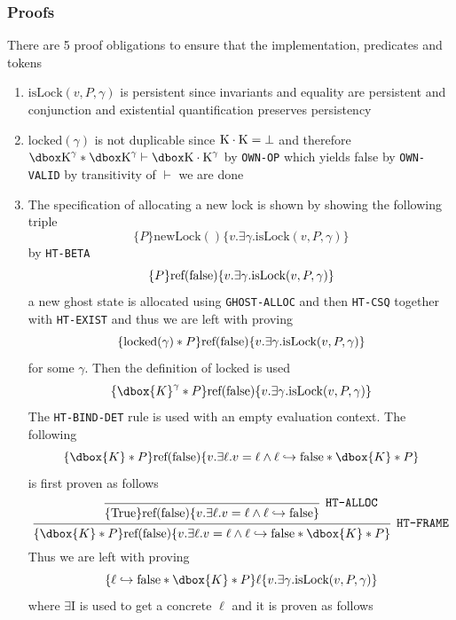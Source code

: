\subsubsection{Proofs}
There are 5 proof obligations to ensure that the implementation, predicates and tokens 
\begin{enumerate}
	\item $\text{isLock}(v,P,\gamma)$ is persistent since invariants and equality are persistent and conjunction and existential quantification preserves persistency
  \item $\text{locked}(\gamma)$ is not duplicable since $\text{K} \cdot \text{K} = \bot$ and therefore $\dboxed{\Key}^\gamma * \dboxed{\Key}^\gamma \vdash \dboxed{\Key \cdot \Key} ^ \gamma$ by \texttt{OWN-OP} which yields false by \texttt{OWN-VALID} by transitivity of $\vdash$ we are done 
  \item The specification of allocating a new lock is shown by showing the following triple
  \[
    \{P\} \text{newLock}() \{v.\exists \gamma . \text{isLock}(v,P, \gamma)\}
  \]
  by \texttt{HT-BETA} 
  \[
    \{P\} \text{ref}(\text{false}) \{v.\exists \gamma . \text{isLock}(v,P, \gamma)\}
  \]
  a new ghost state is allocated using \texttt{GHOST-ALLOC} and then \texttt{HT-CSQ} together with \texttt{HT-EXIST} and thus we are left with proving
  \[
    \{\text{locked}(\gamma) * P\} \text{ref}(\text{false}) \{v. \exists \gamma. \text{isLock}(v,P,\gamma)\}
  \]
  for some $\gamma$. Then the definition of locked is used
  \begin{equation*}
    \{\dbox{K}^\gamma * P\} \text{ref}(\text{false}) \{v. \exists \gamma. \text{isLock} (v, P, \gamma)\}
  \end{equation*}
  The \texttt{HT-BIND-DET} rule is used with an empty evaluation context. The following 
  \[
    \{\dbox{K} * P\} \text{ref}(\text{false}) \{v.\exists \ell. v= \ell \land \ell \hookrightarrow \text{false} * \dbox{K} * P\}
  \]
  is first proven as follows
  \[
  \begin{prooftree} 
    \infer0[\texttt{HT-ALLOC}]{\{\text{True}\} \text{ref}(\text{false}) \{v.\exists \ell. v= \ell \land \ell \hookrightarrow \text{false}\}}
    \infer1[\texttt{HT-FRAME}]{\{\dbox{K} * P\} \text{ref}(\text{false}) \{v.\exists \ell. v= \ell \land \ell \hookrightarrow \text{false} * \dbox{K} * P\}}
  \end{prooftree}
  \]
  Thus we are left with proving 
  \[
    \{\ell \hookrightarrow \text{false} * \dbox{K} * P\} \ell \{v. \exists \gamma. \text{isLock} (v, P, \gamma)\}
  \]
  where $\exists$I is used to get a concrete $\ell$ and it is proven as follows

\end{enumerate}
